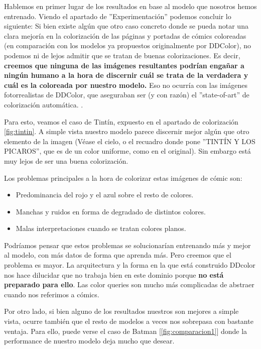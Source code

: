\documentclass[a4paper]{article}
\begin{document}
Hablemos en primer lugar de los resultados en base al modelo que nosotros hemos entrenado. Viendo el apartado de ''Experimentación'' podemos concluir lo siguiente: Si bien existe algún que otro caso concreto donde se pueda notar una clara mejoría en la colorización de las páginas y portadas de cómics coloreadas (en comparación con los modelos ya propuestos originalmente por DDColor), no podemos ni de lejos admitir que se tratan de buenas colorizaciones. Es decir, \textbf{creemos que ninguna de las imágenes resultantes podrían engañar a ningún humano a la hora de discernir cuál se trata de la verdadera y cuál es la coloreada por nuestro modelo.} Eso no ocurría con las imágenes fotorrealistas de DDColor, que aseguraban ser (y con razón) el ''state-of-art'' de colorización automática. \cite{DDColor}. 

Para esto, veamos el caso de Tintín, expuesto en el apartado de colorización \ref{fig:tintin}. A simple vista nuestro modelo parece discernir mejor algún que otro elemento de la imagen (Véase el cielo, o el recuadro donde pone ''TINTÍN Y LOS PICAROS'', que es de un color uniforme, como en el original). Sin embargo está muy lejos de ser una buena colorización. 

Los problemas principales a la hora de colorizar estas imágenes de cómic son:

\begin{itemize}
	\item Predominancia del rojo y el azul sobre el resto de colores.
	\item Manchas y ruidos en forma de degradado de distintos colores.
	\item Malas interpretaciones cuando se tratan colores planos.
\end{itemize}

\medskip
Podríamos pensar que estos problemas se solucionarían entrenando más y mejor al modelo, con más datos de forma que aprenda más. Pero creemos que el problema es mayor. La arquitectura y la forma en la que está construido DDcolor nos hace dilucidar que no trabaja bien en este dominio porque \textbf{no está preparado para ello}. Las color queries son mucho más complicadas de abstraer cuando nos referimos a cómics.

\medskip
Por otro lado, si bien alguno de los resultados nuestros son mejores a simple vista, ocurre también que el resto de modelos a veces nos sobrepasa con bastante ventaja. Para ello, puede verse el caso de Batman [\ref{fig:comparacion1}] donde la performance de nuestro modelo deja mucho que desear.
\end{document}
